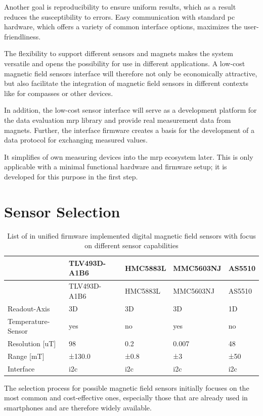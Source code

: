 Another goal is reproducibility to ensure uniform results, which as a
result reduces the susceptibility to errors. Easy communication with
standard \gls{pc} hardware, which offers a variety of common interface
options, maximizes the user-friendliness.

The flexibility to support different sensors and magnets makes the
system versatile and opens the possibility for use in different
applications. A low-cost magnetic field sensors interface will therefore
not only be economically attractive, but also facilitate the integration
of magnetic field sensors in different contexts like for compasses or
other devices.

In addition, the low-cost sensor interface will serve as a development
platform for the data evaluation \gls{mrp} library and provide real
measurement data from magnets. Further, the interface firmware creates a
basis for the development of a data protocol for exchanging measured
values.

It simplifies of own measuring devices into the \gls{mrp} ecosystem
later. This is only applicable with a minimal functional hardware and
firmware setup; it is developed for this purpose in the first step.

\newpage

\hypertarget{sensor-selection}{%
\section{Sensor Selection}\label{sensor-selection}}

\begin{longtable}[]{@{}lllll@{}}
\caption{List of in unified firmware implemented digital magnetic field
sensors with focus on different sensor capabilities
\label{List_of_in_unified_firmware_implemented_digital_magnetic_field_sensors_with_focus_on_different_sensor_capabilities.csv}}\tabularnewline
\toprule
& TLV493D-A1B6 & HMC5883L & MMC5603NJ & AS5510\tabularnewline
\midrule
\endfirsthead
\toprule
& TLV493D-A1B6 & HMC5883L & MMC5603NJ & AS5510\tabularnewline
\midrule
\endhead
Readout-Axis & 3D & 3D & 3D & 1D\tabularnewline
Temperature-Sensor & yes & no & yes & no\tabularnewline
Resolution {[}uT{]} & 98 & 0.2 & 0.007 & 48\tabularnewline
Range {[}mT{]} & ±130.0 & ±0.8 & ±3 & ±50\tabularnewline
Interface & \gls{i2c} & \gls{i2c} & \gls{i2c} & \gls{i2c}\tabularnewline
\bottomrule
\end{longtable}

The selection process for possible magnetic field sensors initially
focuses on the most common and cost-effective ones, especially those
that are already used in smartphones and are therefore widely available.

